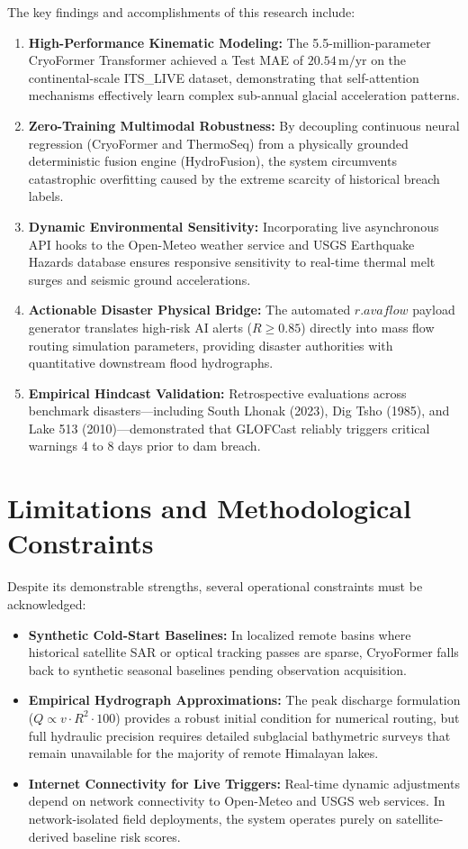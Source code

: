 \documentclass{mnnit}
\begin{document}
The key findings and accomplishments of this research include:
\begin{enumerate}
    \item \textbf{High-Performance Kinematic Modeling:} The 5.5-million-parameter CryoFormer Transformer achieved a Test MAE of $20.54\,\text{m/yr}$ on the continental-scale ITS\_LIVE dataset, demonstrating that self-attention mechanisms effectively learn complex sub-annual glacial acceleration patterns.
    \item \textbf{Zero-Training Multimodal Robustness:} By decoupling continuous neural regression (CryoFormer and ThermoSeq) from a physically grounded deterministic fusion engine (HydroFusion), the system circumvents catastrophic overfitting caused by the extreme scarcity of historical breach labels.
    \item \textbf{Dynamic Environmental Sensitivity:} Incorporating live asynchronous API hooks to the Open-Meteo weather service and USGS Earthquake Hazards database ensures responsive sensitivity to real-time thermal melt surges and seismic ground accelerations.
    \item \textbf{Actionable Disaster Physical Bridge:} The automated $r.avaflow$ payload generator translates high-risk AI alerts ($R \ge 0.85$) directly into mass flow routing simulation parameters, providing disaster authorities with quantitative downstream flood hydrographs.
    \item \textbf{Empirical Hindcast Validation:} Retrospective evaluations across benchmark disasters---including South Lhonak (2023), Dig Tsho (1985), and Lake 513 (2010)---demonstrated that GLOFCast reliably triggers critical warnings 4 to 8 days prior to dam breach.
\end{enumerate}

\section{Limitations and Methodological Constraints}
Despite its demonstrable strengths, several operational constraints must be acknowledged:
\begin{itemize}
    \item \textbf{Synthetic Cold-Start Baselines:} In localized remote basins where historical satellite SAR or optical tracking passes are sparse, CryoFormer falls back to synthetic seasonal baselines pending observation acquisition.
    \item \textbf{Empirical Hydrograph Approximations:} The peak discharge formulation ($Q \propto v \cdot R^2 \cdot 100$) provides a robust initial condition for numerical routing, but full hydraulic precision requires detailed subglacial bathymetric surveys that remain unavailable for the majority of remote Himalayan lakes.
    \item \textbf{Internet Connectivity for Live Triggers:} Real-time dynamic adjustments depend on network connectivity to Open-Meteo and USGS web services. In network-isolated field deployments, the system operates purely on satellite-derived baseline risk scores.
\end{itemize}
\end{document}
